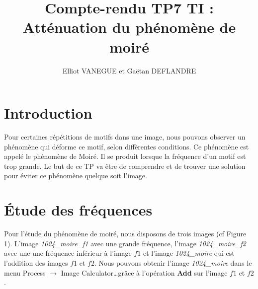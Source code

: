 \documentclass[a4paper,11pt]{article}
\title{Compte-rendu TP7 TI : Atténuation du phénomène de moiré}
\author{Elliot VANEGUE et Gaëtan DEFLANDRE}
\begin{document}


  \maketitle
  
  \mbox{}
  \newpage
  \clearpage
  
  \section*{Introduction}
  Pour certaines répétitions de motifs dans une image, nous pouvons observer un phénomène qui déforme ce motif, selon diffèrentes conditions. 
  Ce phénomène est appelé le phénomène de Moiré. Il se produit lorsque la fréquence d’un motif est trop grande. Le but de ce TP va être de 
  comprendre et de trouver une solution pour éviter ce phénomène quelque soit l’image.\\
 
  \section{Étude des fréquences}
  Pour l’étude du phénomène de moiré, nous disposons de trois images (cf Figure 1). L’image \textit{1024\_moire\_f1} avec une grande fréquence, 
  l’image \textit{1024\_moire\_f2} avec une une fréquence inférieur à l’image $f1$ et l’image \textit{1024\_moire} qui est l’addition des images 
  $f1$ et $f2$. Nous pouvons obtenir l’image \textit{1024\_moire} dans le menu Process $\rightarrow$ Image Calculator\ldots grâce à l’opération 
  \textbf{Add} sur l’image $f1$ et $f2$.\\
\end{document}
